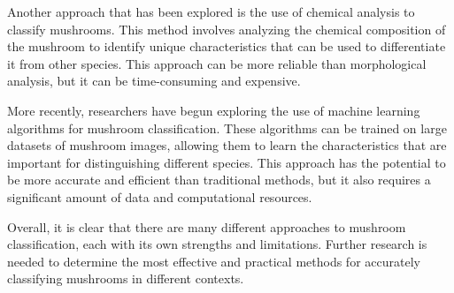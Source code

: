 \documentclass[a4paper,11pt]{article}
\begin{document}
            Another approach that has been explored is the use of chemical analysis to classify mushrooms. This method involves analyzing the chemical composition of the mushroom to identify unique characteristics that can be used to differentiate it from other species. This approach can be more reliable than morphological analysis, but it can be time-consuming and expensive.

            More recently, researchers have begun exploring the use of machine learning algorithms for mushroom classification. These algorithms can be trained on large datasets of mushroom images, allowing them to learn the characteristics that are important for distinguishing different species. This approach has the potential to be more accurate and efficient than traditional methods, but it also requires a significant amount of data and computational resources.

            Overall, it is clear that there are many different approaches to mushroom classification, each with its own strengths and limitations. Further research is needed to determine the most effective and practical methods for accurately classifying mushrooms in different contexts.


        
\end{document}
